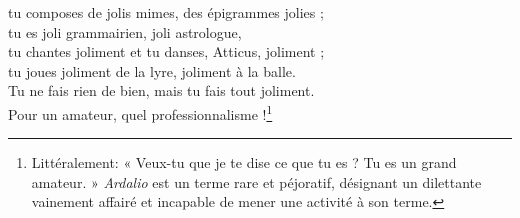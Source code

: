 \documentclass[12pt]{book} %
\begin{document}
\begin{alignment}
\begin{translation}
\begin{ekdverse}[type={distiques_élégiaques}]
\begin{patverse*}
          tu composes de jolis mimes, des épigrammes jolies ; \\ 
          tu es joli grammairien, joli astrologue, \\ 
          tu chantes joliment et tu danses, Atticus, joliment ; \\ 
          tu joues joliment de la lyre, joliment à la balle. \\ 
          Tu ne fais rien de bien, mais tu fais tout joliment. \\ 
          Pour un amateur, quel professionnalisme !\footnote{Littéralement: « Veux-tu que je te dise ce que tu es ? Tu es un grand amateur. » \emph{Ardalio} est un terme rare et péjoratif, désignant un dilettante vainement affairé et incapable de mener une activité à son terme.} \\
        \end{patverse*} 
    \end{ekdverse}
  \end{translation}
\end{alignment}

\end{document}
